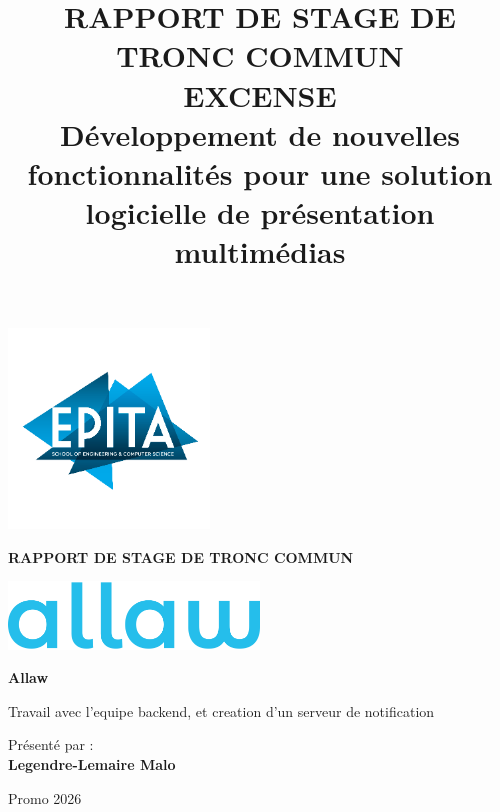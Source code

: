 \documentclass[12pt,a4paper]{report}
\title{RAPPORT DE STAGE DE TRONC COMMUN\\
       \large{EXCENSE}\\
       \large{Développement de nouvelles fonctionnalités pour une solution logicielle de présentation multimédias}}
\date{}
\begin{document}

\begin{titlepage}
\begin{center}
\includegraphics[width=0.4\textwidth]{media/image1.png}

\vspace{1cm}
{\huge\bfseries RAPPORT DE STAGE DE TRONC COMMUN\par}
\vspace{1cm}

\includegraphics[width=0.5\textwidth]{media/allaw.png}

\vspace{1.5cm}
{\Large\bfseries Allaw\par}
\vspace{0.5cm}
{\large Travail avec l'equipe backend, et creation d'un serveur de notification\par}

\vfill  %

{\large Présenté par :\\
\textbf{Legendre-Lemaire Malo}\par}  %

\vspace{0.5cm}
{\large Promo 2026\par}  %
\end{center}
\end{titlepage}

\tableofcontents
\newpage

\end{document}
